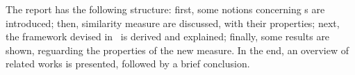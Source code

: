 The report has the following structure:
first, some notions concerning \dl{}s are introduced;
then, similarity measure are discussed, with their properties;
next, the framework devised in~\cite{LeTu12} is derived and explained;
finally, some results are shown, reguarding the properties of the new measure.
In the end, an overview of related works is presented, followed by a brief conclusion.
